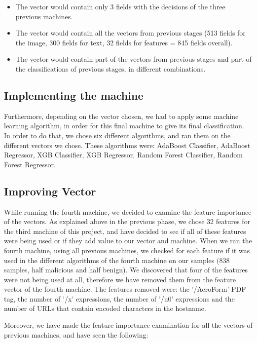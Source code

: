 \documentclass{article}
\begin{document}
\renewcommand{\labelitemi}{$\textendash$}
\begin{itemize}
    \item  The vector would contain only 3 fields with the decisions of the three previous machines.
    \item The vector would contain all the vectors from previous stages (513 fields for the image, 300 fields for text, 32 fields for features = 845 fields overall).
	\item The vector would contain part of the vectors from previous stages and part of the classifications of previous stages, in different combinations.
\end{itemize}

\subsection{Implementing the machine}
\indent Furthermore, depending on the vector chosen, we had to apply some machine learning algorithm, in order for this final machine to give its final classification. In order to do that, we chose six different algorithms, and ran them on the different vectors we chose. These algorithms were: AdaBoost Classifier, AdaBoost Regressor, XGB Classifier, XGB Regressor, Random Forest Classifier, Random Forest Regressor.

\subsection{Improving Vector}
\indent While running the fourth machine, we decided to examine the feature importance of the vectors. As explained above in the previous phase, we chose 32 features for the third machine of this project, and have decided to see if all of these features were being used or if they add value to our vector and machine. When we ran the fourth machine, using all previous machines, we checked for each feature if it was used in the different algorithms of the fourth machine on our samples (838 samples, half malicious and half benign). We discovered that four of the features were not being used at all, therefore we have removed them from the feature vector of the fourth machine. The features removed were: the '/AcroForm' PDF tag, the number of '/x' expressions, the number of '/u0' expressions and the number of URLs that contain encoded characters in the hostname.

\indent	Moreover, we have made the feature importance examination for all the vectors of previous machines, and have seen the following: 
\end{document}
